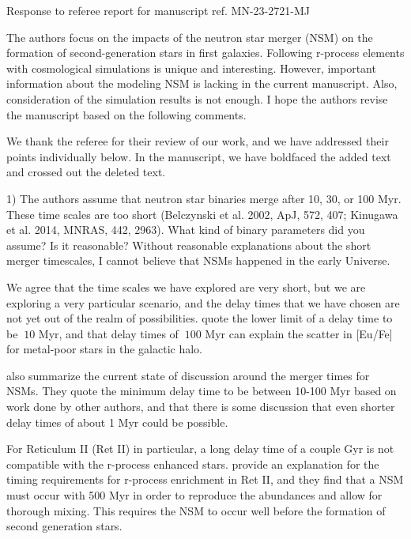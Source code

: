 \documentclass[11pt]{article}
\begin{document}
\begin{center} 
\bfseries{
\begin{large}
  Response to referee report for manuscript ref. MN-23-2721-MJ
\end{large}
}
\end{center}

\begin{tcolorbox}[colback={lightgray}]
    The authors focus on the impacts of the neutron star merger (NSM) on the formation of second-generation stars in first galaxies. Following r-process elements with cosmological simulations is unique and interesting. However, important information about the modeling NSM is lacking in the current manuscript. Also, consideration of the simulation results is not enough. I hope the authors revise the manuscript based on the following comments.
\end{tcolorbox}

We thank the referee for their review of our work, and we have
addressed their points individually below.  In the manuscript, we have
boldfaced the added text and crossed out the deleted text.  

\begin{tcolorbox}[colback={lightgray}]
    1)      The authors assume that neutron star binaries merge after 10, 30, or 100 Myr. These time scales are too short (Belczynski et al. 2002, ApJ, 572, 407; Kinugawa et al. 2014, MNRAS, 442, 2963). What kind of binary parameters did you assume? Is it reasonable? Without reasonable explanations about the short merger timescales, I cannot believe that NSMs happened in the early Universe.
\end{tcolorbox}

We agree that the time scales we have explored are very short, but we are exploring a very particular scenario, and the delay times that we have chosen are not yet out of the realm of possibilities. \citet{Hirai15} quote the lower limit of a delay time to be $~10$ Myr, and that delay times of $~100$ Myr can explain the scatter in [Eu/Fe] for metal-poor stars in the galactic halo. 

\citet{Frebel23} also summarize the current state of discussion around the merger times for NSMs. They quote the minimum delay time to be between 10-100 Myr based on work done by other authors, and that there is some discussion that even shorter delay times of about 1 Myr could be possible.

For Reticulum II (Ret II) in particular, a long delay time of a couple Gyr is not compatible with the r-process enhanced stars. \citet{Simon23} provide an explanation for the timing requirements for r-process enrichment in Ret II, and they find that a NSM must occur with 500 Myr in order to reproduce the abundances and allow for thorough mixing. This requires the NSM to occur well before the formation of second generation stars.
\end{document}

